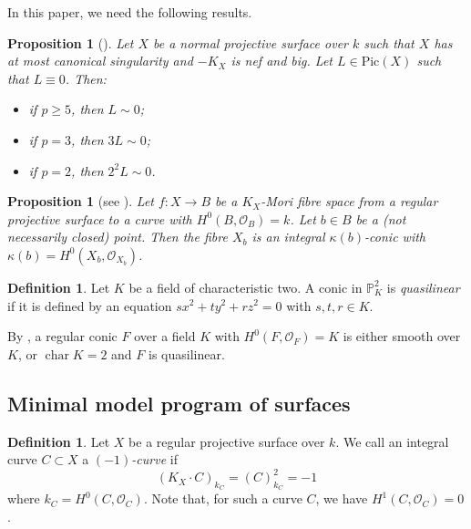 \documentclass[10pt,abstract=true]{scrartcl}
\numberwithin{equation}{section}
\newtheorem{proposition}[theorem]{Proposition}
\theoremstyle{definition}
\newtheorem{definition}[theorem]{Definition}
\theoremstyle{remark}
\begin{document}
In this paper, we need the following results.
\begin{proposition}[{\cite[Theorem~4.1]{Bernasconi-Tanaka-22}}]\label{prop-ell_F-del-Pezzo}%
  Let $X$ be a normal projective surface over $k$ such that $X$ has at most canonical singularity and $-K_X$ is nef and big. 
  Let $L\in \mathrm{Pic}(X)$ such that $L \equiv 0$.
  Then:
  \begin{itemize}
    \item[\textup{(1)}] if $p\geq5$, then $L\sim0$;
    \item[\textup{(2)}] if $p=3$, then $3L\sim0$;
    \item[\textup{(3)}] if $p=2$, then $2^2L\sim0$.
  \end{itemize}
\end{proposition}

\begin{proposition}[see {\cite[Proposition~2.18]{Bernasconi-Tanaka-22}}]\label{prop:Mori-f-BT22}%
  Let $f\colon X\to B$ be a $K_X$-Mori fibre space from a regular projective  surface to a curve with $H^0(B,\mathcal O_B) = k$.
  Let $b\in B$ be a (not necessarily closed) point.
  Then the fibre $X_b$ is an integral $\kappa(b)$-conic with $\kappa(b) = H^0(X_b, \mathcal O_{X_b})$.
\end{proposition}

\begin{definition}\label{def:quasilinear}
  Let $K$ be a field of characteristic two.
  A conic in $\mathbb P^2_K$ is \textit{quasilinear} if it is defined by an equation $sx^2+ty^2+rz^2=0$ with $s,t,r\in K$.
\end{definition}
By \cite[Theorem~9.10\,(5),\,(6)]{tanaka_invariants_2021}, a regular conic $F$ over a field $K$ with $H^0(F,\mathcal O_F)=K$ is either smooth over $K$, or $\operatorname{char}K=2$ and $F$ is quasilinear.

\subsection{Minimal model program of surfaces}\label{sec:mmp}%
\begin{definition}
  Let $X$ be a regular projective surface over $k$.
  We call an integral curve $C \subset X$ a \emph{$(-1)$-curve} if
  \[
    (K_X\cdot C)_{k_C} = (C)^2_{k_C} = -1
  \]
  where $k_C = H^0(C, \mathcal O_C)$.
  Note that, for such a curve $C$, we have $H^1(C,\mathcal O_C) = 0$.
\end{definition}
\end{document}
